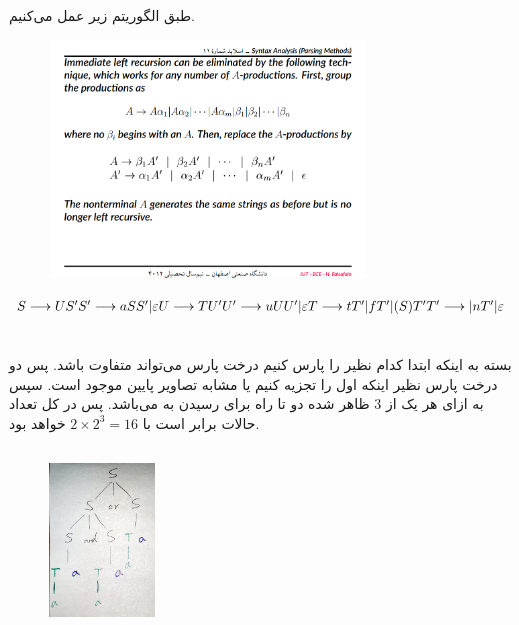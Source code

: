 \documentclass{article}
\begin{document}
\subsection{}
طبق الگوریتم زیر عمل می‌کنیم.
\begin{figure}[H]
    \centering
    \includegraphics[width=0.75\textwidth]{figures/1b.png}
    \caption
	{}
    \label{fig:fig1}
\end{figure}

\begin{latin}
$
S \longrightarrow US ^ \prime \\
S ^ \prime \longrightarrow aSS ^ \prime | \varepsilon \\
U \longrightarrow TU ^ \prime \\
U ^ \prime \longrightarrow uUU ^ \prime | \varepsilon \\
T \longrightarrow tT ^ \prime | fT ^ \prime | (S)T ^ \prime \\
T ^ \prime \longrightarrow | nT ^ \prime | \varepsilon
$
\end{latin}

\section{}%
بسته به اینکه ابتدا کدام  نظیر  را پارس کنیم درخت پارس می‌تواند متفاوت باشد. پس دو درخت پارس نظیر اینکه اول  را تجزیه کنیم یا  مشابه تصاویر پایین موجود است. سپس به ازای هر یک از 3  ظاهر شده دو تا راه برای رسیدن به  می‌باشد. پس در کل تعداد حالات برابر است با $2 \times 2 ^ 3 = 16$ خواهد بود.

\subsection{}
\begin{figure}[H]
    \centering
    \includegraphics[width=0.25\textwidth]{figures/c1.jpg}
    \caption
	{}
    \label{fig:fig1}
\end{figure}
\end{document}
